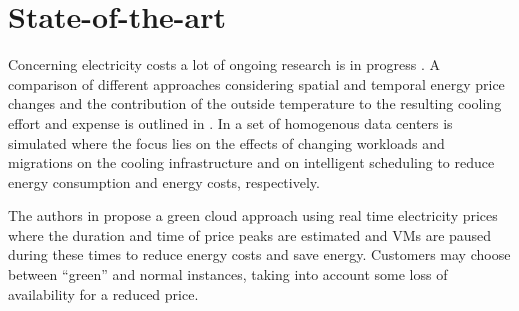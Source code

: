 \documentclass[a4paper]{article}
\begin{document}



\section{State-of-the-art}

Concerning electricity costs a lot of ongoing research is in progress \cite{guler2013cutting, le2011reducing}. A comparison of different approaches considering spatial and temporal energy price changes and the contribution of the outside temperature to the resulting cooling effort and expense is outlined in \cite{guler2013cutting}. In \cite{le2011reducing} a set of homogenous data centers is simulated where the focus lies on the effects of changing workloads and migrations on the cooling infrastructure and on intelligent scheduling to reduce energy consumption and energy costs, respectively. 


The authors in \cite{lucanin2013take} propose a green cloud approach using real time electricity prices where the duration and time of price peaks are estimated and VMs are paused during these times to reduce energy costs and save energy. Customers may choose between ``green'' and normal instances, taking into account some loss of availability for a reduced price. 
\end{document}

